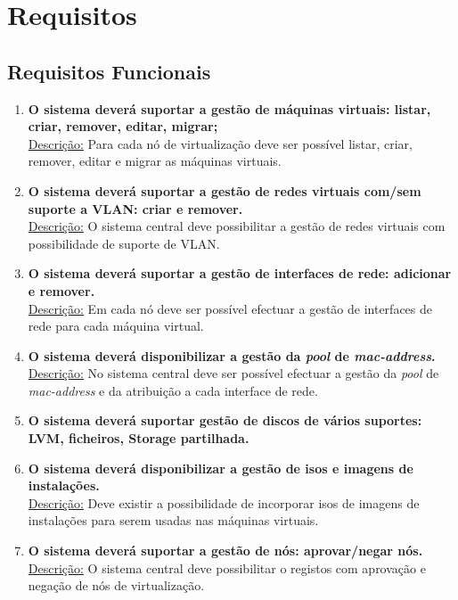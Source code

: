 \documentclass[a4paper,11pt,titlepage]{article}
\begin{document}
\section{Requisitos}
\subsection{Requisitos Funcionais}

\begin{enumerate}

\item \textbf{O sistema deverá suportar a gestão de máquinas virtuais: listar, criar, remover, editar, migrar;} \\
\underline{Descrição:} Para cada nó de virtualização deve ser possível listar, criar, remover, editar e migrar as máquinas virtuais.

\item \textbf{O sistema deverá suportar a gestão de redes virtuais com/sem suporte a VLAN: criar e remover.} \\
\underline{Descrição:} O sistema central deve possibilitar a gestão de redes virtuais com possibilidade de suporte de VLAN.

\item \textbf{O sistema deverá suportar a gestão de interfaces de rede: adicionar e remover.} \\
\underline{Descrição:} Em cada nó deve ser possível efectuar a gestão de interfaces de rede para cada máquina virtual.

\item \textbf{O sistema deverá disponibilizar a gestão da \emph{pool} de \emph{mac-address}.} \\
\underline{Descrição:} No sistema central deve ser possível efectuar a gestão da \emph{pool} de \emph{mac-address} e da atribuição a cada interface de rede.

\item \textbf{O sistema deverá suportar gestão de discos de vários suportes: LVM, ficheiros, Storage partilhada.} \\

\item \textbf{O sistema deverá disponibilizar a gestão de isos e imagens de instalações.} \\
\underline{Descrição:} Deve existir a possibilidade de incorporar isos de imagens de instalações para serem usadas nas máquinas virtuais.

\item \textbf{O sistema deverá suportar a gestão de nós: aprovar/negar nós.} \\
\underline{Descrição:} O sistema central deve possibilitar o registos com aprovação e negação de nós de virtualização.


\end{enumerate}
\end{document}

